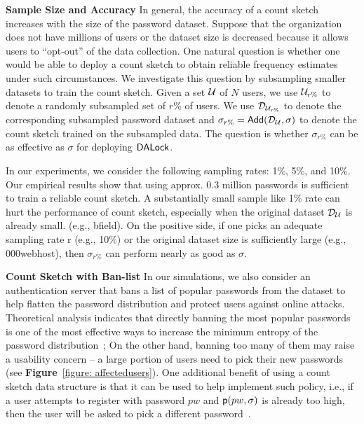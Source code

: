 \textbf{Sample Size and Accuracy} In general, the accuracy of a count sketch increases with the size of the password dataset. Suppose that the organization does not have millions of users or the dataset size is decreased because it allows users to ``opt-out” of the data collection. One natural question is whether one would be able to deploy a count sketch to obtain reliable frequency estimates under such circumstances. We investigate this question by subsampling smaller datasets to train the count sketch. Given a set $\mathcal{U}$ of $N$ users, we use $\mathcal{U}_{r\%}$ to denote a randomly subsampled set of $r\%$ of users. We use $\mathcal{D}_{{\mathcal{U}_{r\%}}}$ to denote the corresponding subsampled password dataset and $\sigma_{r\%} = \mathsf{Add}(\mathcal{D}_{{\mathcal{U}}},\sigma) $ to denote the count sketch trained on the subsampled data. The question is whether $\sigma_{r\%}$ can be as effective as $\sigma$ for deploying $\mathsf{DALock}$. 




In our experiments, we consider the following sampling rates: 1\%, 5\%, and 10\%. Our empirical results show that using approx. 0.3 million passwords is sufficient to train a reliable count sketch. A substantially small sample like 1\% rate can hurt the performance of count sketch, especially when the original dataset $\mathcal{D}_{{\mathcal{U}}}$ is already small. (e.g., bfield). On the positive side, if one picks an adequate sampling rate r (e.g., 10\%) or the original dataset size is sufficiently large (e.g., 000webhost), then $\sigma_{r\%}$ can perform nearly as good as $\sigma$.





\textbf{Count Sketch with Ban-list} In our simulations, we also consider an authentication server that bans a list of popular passwords from the dataset to help flatten the password distribution and protect users against online attacks. Theoretical analysis indicates that directly banning the most popular passwords is one of the most effective ways to increase the minimum entropy of the password distribution~\cite{BKPS:ACMEC13}; On the other hand, banning too many of them may raise a usability concern – a large portion of users need to pick their new passwords (see \textbf{Figure}~\ref{figure: affectedusers}). One additional benefit of using a count sketch data structure is that it can be used to help implement such policy, i.e., if a user attempts to register with password $pw$ and $\textsf{p}(pw,\sigma)$ is already too high, then the user will be asked to pick a different password~\cite{HTS:SchHerMit10}.

